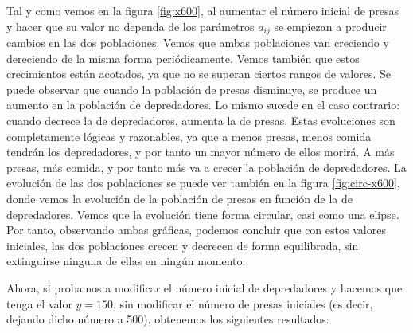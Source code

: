 \documentclass[11pt,a4paper]{article}
\begin{document}
Tal y como vemos en la figura \ref{fig:x600}, al aumentar el número inicial de presas y hacer que
su valor no dependa de los parámetros $a_{ij}$ se empiezan a producir cambios en las dos poblaciones.
Vemos que ambas poblaciones van creciendo y dereciendo de la misma forma periódicamente. Vemos también
que estos crecimientos están acotados, ya que no se superan ciertos rangos de valores. Se puede observar
que cuando la población de presas disminuye, se produce un aumento en la población de depredadores.
Lo mismo sucede en el caso contrario: cuando decrece la de depredadores, aumenta la de presas. Estas evoluciones
son completamente lógicas y razonables, ya que a menos presas, menos comida tendrán los depredadores, y por tanto
un mayor número de ellos morirá. A más presas, más comida, y por tanto más va a crecer la población de depredadores.
La evolución de las dos poblaciones se puede ver también en la figura \ref{fig:circ-x600}, donde vemos
la evolución de la población de presas en función de la de depredadores. Vemos que la evolución tiene
forma circular, casi como una elipse. Por tanto, observando ambas gráficas, podemos concluir que con estos
valores iniciales, las dos poblaciones crecen y decrecen de forma equilibrada, sin extinguirse ninguna de ellas
en ningún momento.

Ahora, si probamos a modificar el número inicial de depredadores y hacemos que tenga el valor
$y = 150$, sin modificar el número de presas iniciales (es decir, dejando dicho número a 500),
obtenemos los siguientes resultados:
\end{document}
